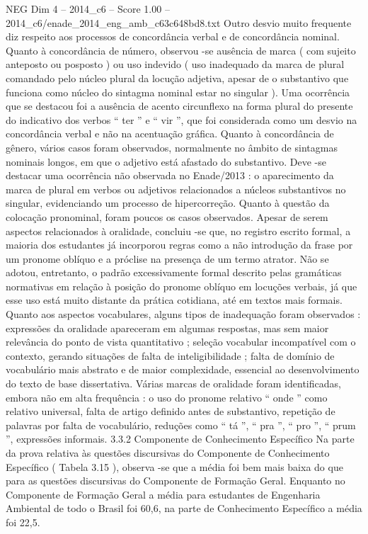 \begin{textsample}{NEG Dim 4 – 2014\_c6 – Score 1.00 – 2014\_c6/enade\_2014\_eng\_amb\_c63c648bd8.txt}
Outro desvio muito frequente diz respeito aos processos de concordância verbal e de concordância nominal.
Quanto à concordância de número, observou -se ausência de marca ( com sujeito anteposto ou posposto ) ou uso indevido ( uso inadequado da marca de plural comandado pelo núcleo plural da locução adjetiva, apesar de o substantivo que funciona como núcleo do sintagma nominal estar no singular ).
Uma ocorrência que se destacou foi a ausência de acento circunflexo na forma plural do presente do indicativo dos verbos “ ter ” e “ vir ”, que foi considerada como um desvio na concordância verbal e não na acentuação gráfica.
Quanto à concordância de gênero, vários casos foram observados, normalmente no âmbito de sintagmas nominais longos, em que o adjetivo está afastado do substantivo.
Deve -se destacar uma ocorrência não observada no Enade/2013 : o aparecimento da marca de plural em verbos ou adjetivos relacionados a núcleos substantivos no singular, evidenciando um processo de hipercorreção.
Quanto à questão da colocação pronominal, foram poucos os casos observados.
Apesar de serem aspectos relacionados à oralidade, concluiu -se que, no registro escrito formal, a maioria dos estudantes já incorporou regras como a não introdução da frase por um pronome oblíquo e a próclise na presença de um termo atrator.
Não se adotou, entretanto, o padrão excessivamente formal descrito pelas gramáticas normativas em relação à posição do pronome oblíquo em locuções verbais, já que esse uso está muito distante da prática cotidiana, até em textos mais formais.
Quanto aos aspectos vocabulares, alguns tipos de inadequação foram observados : expressões da oralidade apareceram em algumas respostas, mas sem maior relevância do ponto de vista quantitativo ; seleção vocabular incompatível com o contexto, gerando situações de falta de inteligibilidade ; falta de domínio de vocabulário mais abstrato e de maior complexidade, essencial ao desenvolvimento do texto de base dissertativa.
Várias marcas de oralidade foram identificadas, embora não em alta frequência : o uso do pronome relativo “ onde ” como relativo universal, falta de artigo definido antes de substantivo, repetição de palavras por falta de vocabulário, reduções como “ tá ”, “ pra ”, “ pro ”, “ prum ”, expressões informais. 3.3.2 Componente de Conhecimento Específico Na parte da prova relativa às questões discursivas do Componente de Conhecimento Específico ( Tabela 3.15 ), observa -se que a média foi bem mais baixa do que para as questões discursivas do Componente de Formação Geral.
Enquanto no Componente de Formação Geral a média para estudantes de Engenharia Ambiental de todo o Brasil foi 60,6, na parte de Conhecimento Específico a média foi 22,5.

\end{textsample}
